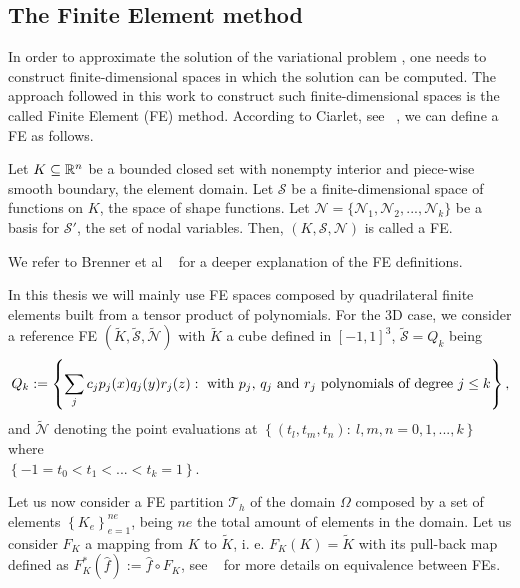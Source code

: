 \subsection{The Finite Element method}
\label{subsec-variational_finite_element}
In order to approximate the solution of the variational problem , one needs to construct finite-dimensional spaces in which the solution can be computed. The approach followed in this work to construct such finite-dimensional spaces is the called Finite Element (FE) method. According to Ciarlet, see ~\cite{ciarlet_finite_1978}, we can define a FE as follows.

Let $ K\subseteq\mathbb{R}^n $ be a bounded closed set with nonempty interior and piece-wise smooth boundary, the element domain. Let $ \mathcal{S} $ be a finite-dimensional space of functions on $ K $, the space of shape functions. Let $ \mathcal{N}=\{\mathcal{N}_1,\mathcal{N}_2,...,\mathcal{N}_k\} $ be a basis for $ \mathcal{S}' $, the set of nodal variables. Then, $ (K,\mathcal{S},\mathcal{N}) $ is called a FE.

We refer to Brenner et al ~\cite{brenner_mathematical_2007} for a deeper explanation of the FE definitions.

In this thesis we will mainly use FE spaces composed by quadrilateral finite elements built from a tensor product of polynomials. For the 3D case, we consider a reference FE $ (\widetilde{K},\widetilde{\mathcal{S}},\widetilde{\mathcal{N}}) $ with $ \widetilde{K} $ a cube defined in $ [-1,1]^3 $, $ \widetilde{\mathcal{S}}=Q_k $ being
$$ Q_k:=\left\{\sum_jc_jp_j(x)q_j(y)r_j(z):\mbox{ with $ p_j $, $ q_j $ and $ r_j $ polynomials of degree $j \leq k $}\right\}, $$
and $ \widetilde{\mathcal{N}} $ denoting the point evaluations at $ \left\{(t_l,t_m,t_n):\ l,m,n=0,1,...,k \right\} $ where \\$\left\{-1 = t_0 < t_1 < ... < t_k = 1 \right\}$.

Let us now consider a FE partition $ \mathcal{T}_h $ of the domain $ \Omega $ composed by a set of elements $ \left\{K_e\right\}_{e=1}^{ne} $, being $ ne $ the total amount of elements in the domain. Let us consider $ F_K $ a mapping from $ K $ to $ \widetilde{K} $, i. e. $ F_K(K)=\widetilde{K} $ with its pull-back map defined as $ F^*_K(\hat{f}):=\hat{f}\circ F_K $, see ~\cite{ciarlet_general_1972,brenner_mathematical_2007} for more details on equivalence between FEs.

